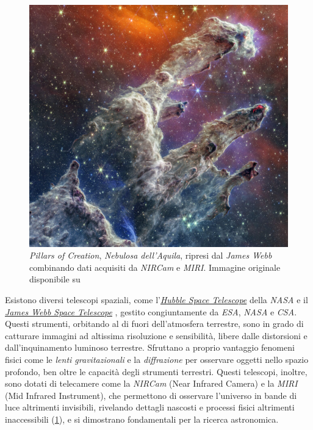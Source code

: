 \begin{figure}[H]
    \centering
    \includegraphics[scale = 0.6]{../assets/Webb_POC.jpg}
    \captionsetup{justification=centering}
    \caption{\textit{Pillars of Creation}, \textit{Nebulosa dell'Aquila}, ripresi dal \textit{James Webb} combinando dati acquisiti da \textit{NIRCam} e \textit{MIRI}. Immagine originale disponibile su \cite{webb_telescope}} \label{fig:webb_poc}
\end{figure}

Esistono diversi telescopi spaziali, come l'\textit{\href{https://hubblesite.org/home}{Hubble Space Telescope}} \cite{hubble} della \textit{NASA} e il \textit{\href{https://webbtelescope.org/home}{James Webb Space Telescope}} \cite{jwst}, gestito congiuntamente da \textit{ESA}, \textit{NASA} e \textit{CSA}. Questi strumenti, orbitando al di fuori dell'atmosfera terrestre, sono in grado di catturare immagini ad altissima risoluzione e sensibilità, libere dalle distorsioni e dall'inquinamento luminoso terrestre. Sfruttano a proprio vantaggio fenomeni fisici come le \textit{lenti gravitazionali} e la \textit{diffrazione} per osservare oggetti nello spazio profondo, ben oltre le capacità degli strumenti terrestri. Questi telescopi, inoltre, sono dotati di telecamere come la \textit{NIRCam} (Near Infrared Camera) e la \textit{MIRI} (Mid Infrared Instrument), che permettono di osservare l'universo in bande di luce altrimenti invisibili, rivelando dettagli nascosti e processi fisici altrimenti inaccessibili (\cref{fig:webb_poc}), e si dimostrano fondamentali per la ricerca astronomica.

